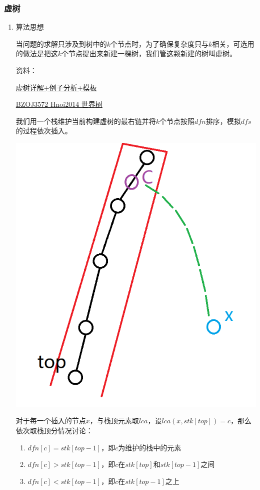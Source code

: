 \documentclass[11pt]{article}
\begin{document}
\subsubsection{虚树}
\label{sec:orgc01fd06}
\begin{enumerate}
\item 算法思想
\label{sec:org8d93f01}


当问题的求解只涉及到树中的\(k\)个节点时，为了确保复杂度只与\(k\)相关，可选用的做法是把这\(k\)个节点提出来新建一棵树，我们管这颗新建的树叫虚树。

资料：

\href{https://www.cnblogs.com/chenhuan001/p/5639482.html}{虚树详解+例子分析+模板}

\href{http://lazycal.logdown.com/posts/202331-bzoj3572}{BZOJ3572 Hnoi2014 世界树}

我们用一个栈维护当前构建虚树的最右链并将\(k\)个节点按照\(dfn\)排序，模拟\(dfs\)的过程依次插入。

\begin{center}
\includegraphics[width=.9\linewidth]{./Source/Picture/virtualtree.png}
\end{center}

对于每一个插入的节点\(x\)，与栈顶元素取\(lca\)，设\(lca(x,stk[top])=c\)，那么依次取栈顶分情况讨论：

\begin{enumerate}
\item \(dfn[c]=stk[top-1]\)，即\(c\)为维护的栈中的元素
\item \(dfn[c]>stk[top-1]\)，即\(c\)在\(stk[top]\)和\(stk[top-1]\)之间
\item \(dfn[c]<stk[top-1]\)，即\(c\)在\(stk[top-1]\)之上
\end{enumerate}


\end{enumerate}
\end{document}
